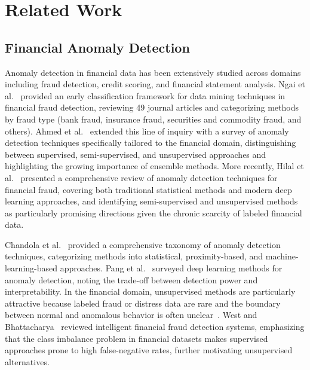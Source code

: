 \documentclass{ieeeaccess}
\begin{document}
\section{Related Work}
\label{sec:related}

\subsection{Financial Anomaly Detection}
\label{subsec:financial_anomaly}
Anomaly detection in financial data has been extensively studied across domains including fraud detection, credit scoring, and financial statement analysis. Ngai et al.~\cite{ngai2011application} provided an early classification framework for data mining techniques in financial fraud detection, reviewing 49 journal articles and categorizing methods by fraud type (bank fraud, insurance fraud, securities and commodity fraud, and others). Ahmed et al.~\cite{ahmed2016survey} extended this line of inquiry with a survey of anomaly detection techniques specifically tailored to the financial domain, distinguishing between supervised, semi-supervised, and unsupervised approaches and highlighting the growing importance of ensemble methods. More recently, Hilal et al.~\cite{hilal2022financial} presented a comprehensive review of anomaly detection techniques for financial fraud, covering both traditional statistical methods and modern deep learning approaches, and identifying semi-supervised and unsupervised methods as particularly promising directions given the chronic scarcity of labeled financial data.

Chandola et al.~\cite{chandola2009anomaly} provided a comprehensive taxonomy of anomaly detection techniques, categorizing methods into statistical, proximity-based, and machine-learning-based approaches. Pang et al.~\cite{pang2021deep} surveyed deep learning methods for anomaly detection, noting the trade-off between detection power and interpretability. In the financial domain, unsupervised methods are particularly attractive because labeled fraud or distress data are rare and the boundary between normal and anomalous behavior is often unclear~\cite{aggarwal2017outlier}. West and Bhattacharya~\cite{west2016intelligent} reviewed intelligent financial fraud detection systems, emphasizing that the class imbalance problem in financial datasets makes supervised approaches prone to high false-negative rates, further motivating unsupervised alternatives.
\end{document}
